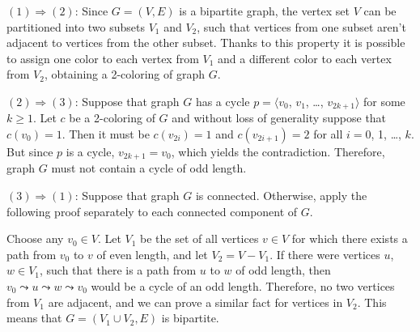 $(1)\Rightarrow(2)$: Since $G=(V,E)$ is a bipartite graph, the vertex set $V$ can be partitioned into two subsets $V_1$ and $V_2$, such that vertices from one subset aren't adjacent to vertices from the other subset.
Thanks to this property it is possible to assign one color to each vertex from $V_1$ and a different color to each vertex from $V_2$, obtaining a 2-coloring of graph $G$.

$(2)\Rightarrow(3)$: Suppose that graph $G$ has a cycle $p=\langle v_0$, $v_1$, \dots, $v_{2k+1}\rangle$ for some $k\ge1$.
Let $c$ be a 2-coloring of $G$ and without loss of generality suppose that $c(v_0)=1$.
Then it must be $c(v_{2i})=1$ and $c(v_{2i+1})=2$ for all $i=0$, 1, \dots, $k$.
But since $p$ is a cycle, $v_{2k+1}=v_0$, which yields the contradiction.
Therefore, graph $G$ must not contain a cycle of odd length.

$(3)\Rightarrow(1)$: Suppose that graph $G$ is connected.
Otherwise, apply the following proof separately to each connected component of $G$.

Choose any $v_0\in V$.
Let $V_1$ be the set of all vertices $v\in V$ for which there exists a path from $v_0$ to $v$ of even length, and let $V_2=V-V_1$.
If there were vertices $u$, $w\in V_1$, such that there is a path from $u$ to $w$ of odd length, then $v_0\leadsto u\leadsto w\leadsto v_0$ would be a cycle of an odd length.
Therefore, no two vertices from $V_1$ are adjacent, and we can prove a similar fact for vertices in $V_2$.
This means that $G=(V_1\cup V_2,E)$ is bipartite.
